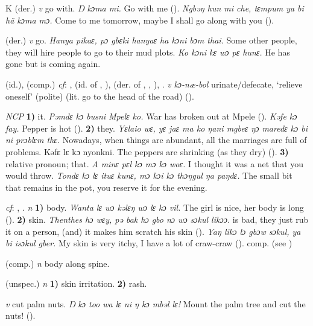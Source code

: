 \begin{letter}{K}
 (der.) \textit{v} go with. \textit{Ŋ kɔma mi.} Go with me (\citealt{Pichl1967}).\textit{ Ngbəŋ hun mi che, tɛmpum ya bi hã kɔma mɔ.} Come to me tomorrow, maybe I shall go along with you (\citealt{Pichl1967}).

 (der.) \textit{v} go. \textit{Hanya pikaɛ, pɔ gbɛki hanyaɛ ha kɔni bɔm thai.} Some other people, they will hire people to go to their mud plots. \textit{Ko kɔni kɛ wɔ pɛ hunɛ.} He has gone but is coming again.

 (id.), (comp.) \textit{cf}: ,  (id. of , ),  (der. of , , ), . \textit{v} \textit{kɔ-næ-bol} urinate/defecate, ‘relieve oneself' (polite) (lit. go to the head of the road) (\citealt{Pichl1967}).

 \textit{NCP} \textbf{1)} it. \textit{Pəmdɛ kɔ busni Mpelɛ ko.} War has broken out at Mpele (\citealt{Pichl1967}). \textit{Kəfe kɔ fay.} Pepper is hot (\citealt{Pichl1967}). \textbf{2)} they. \textit{Yɛlaio wɛ, yɛ jaɛ ma ko ŋani mgbeɛ ŋɔ maredɛ kɔ bi ni prɔblɛm thɛ.} Nowadays, when things are abundant, all the marriages are full of problems. Kəfɛ lɛ kɔ nyonkni. The peppers are shrinking (as they dry) (\citealt{Pichl1967}). \textbf{3)} relative pronoun; that. \textit{A minɛ pɛl kɔ mɔ kɔ woɛ.} I thought it was a net that you would throw. \textit{Tondɛ kɔ lɛ ituɛ kunɛ, mɔ kɔi kɔ thɔŋgul ŋa paŋdɛ.} The small bit that remains in the pot, you reserve it for the evening.

 \textit{cf}: , . \textit{n} \textbf{1)} body.\textit{ Wanta lɛ wɔ kəlɛŋ wɔ lɛ kɔ vil.} The girl is nice, her body is long (\citealt{Pichl1967}). \textbf{2)} skin. \textit{Thenthes hɔ wɛy, pə bak hɔ gbo nɔ wɔ sɔkul likɔɔ.}  is bad, they just rub it on a person, (and) it makes him scratch his skin (\citealt{Pichl1967}). \textit{Yaŋ likɔ lɔ gbɔw sɔkul, ya bi isɔkul gber.} My skin is very itchy, I have a lot of craw-craw (\citealt{Pichl1967}). comp.  (see ) 

 (comp.) \textit{n} body along spine.

 (unspec.) \textit{n} \textbf{1)} skin irritation. \textbf{2)} rash.

 \textit{v} cut palm nuts. \textit{Ŋ kɔ too wa lɛ ni ŋ kɔ mbəl lɛ!} Mount the palm tree and cut the nuts! (\citealt{Pichl1967}). 


\end{letter}
